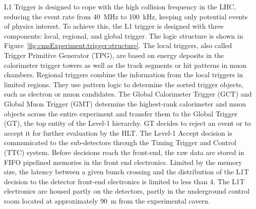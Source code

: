 L1 Trigger is designed to cope with the high collision frequency in the LHC, reducing the event rate from 40~MHz to 100~kHz, keeping only potential events of physics interest. To achieve this, the L1 trigger is designed with three components: local, regional, and global trigger. The logic structure is shown in Figure~\ref{fig:cmsExperiment:trigger:structure}. The local triggers, also called Trigger Primitive Generator (TPG), are based on energy deposits in the calorimeter trigger towers as well as the track segments or hit patterns in muon chambers. Regional triggers combine the information from the local triggers in limited regions. They use pattern logic to determine the sorted trigger objects, such as electron or muon candidates. The  Global Calorimeter Trigger (GCT) and Global Muon Trigger (GMT) determine the highest-rank calorimeter and muon objects across the entire experiment and transfer them to the Global Trigger (GT), the top entity of the Level-1 hierarchy. GT decides to reject an event or to accept it for further evaluation by the HLT. The Level-1 Accept decision is communicated to the sub-detectors through the  Timing Trigger and Control (TTC) system. Before decisions reach the front-end, the raw data are stored in FIFO pipelined memories in the front end electronics. Limited by the memory size, the latency between a given bunch crossing and the distribution of the L1T decision to the detector front-end electronics is limited to less than 4\mus \cite{Trocino:2014jya}. The L1T electronics are housed partly on the detectors, partly in the underground control room located at approximately 90~m from the experimental cavern.


    

